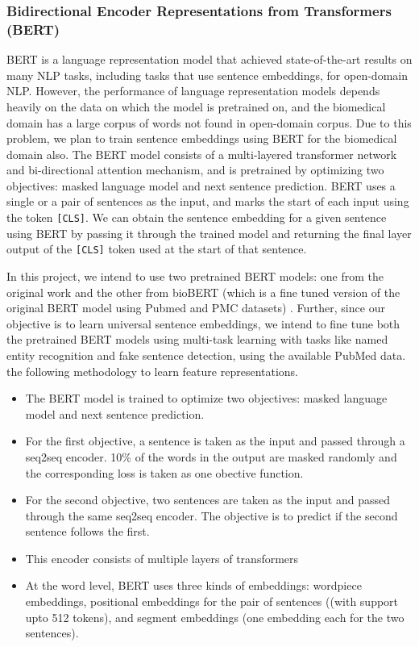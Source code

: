 \documentclass[11pt,a4paper]{article}
\begin{document}
\subsubsection{Bidirectional Encoder Representations from Transformers (BERT) \cite{devlin2018bert}}
BERT is a language representation model that achieved state-of-the-art results on many NLP tasks, including tasks that use sentence embeddings, for open-domain NLP. However, the performance of language representation models depends heavily on the data on which the model is pretrained on, and the biomedical domain has a large corpus of words not found in open-domain corpus. Due to this problem, we plan to train sentence embeddings using BERT for the biomedical domain also. The BERT model consists of a multi-layered transformer network and bi-directional attention mechanism, and is pretrained by optimizing two objectives: masked language model and next sentence prediction. BERT uses a single or a pair of sentences as the input, and marks the start of each input using the token \texttt{[CLS]}. We can obtain the sentence embedding for a given sentence using BERT by passing it through the trained model and returning the final layer output of the \texttt{[CLS]} token used at the start of that sentence.
    
In this project, we intend to use two pretrained BERT models: one from the original work \cite{devlin2018bert} and the other from bioBERT (which is a fine tuned version of the original BERT model using Pubmed and PMC datasets) \cite{lee2019biobert}. Further, since our objective is to learn universal sentence embeddings, we intend to fine tune both the pretrained BERT models using multi-task learning with tasks like named entity recognition and fake sentence detection, using the available PubMed data.
\iffalse
the following methodology to learn feature representations. 
\begin{itemize}
    \item The BERT model is trained to optimize two objectives: masked language model and next sentence prediction.
    \item For the first objective, a sentence is taken as the input and passed through a seq2seq encoder. 10\% of the words in the output are masked randomly and the corresponding loss is taken as one obective function. 
    \item For the second objective, two sentences are taken as the input and passed through the same seq2seq encoder. The objective is to predict if the second sentence follows the first. 
    \item This encoder consists of multiple layers of transformers 
    \item  At the word level, BERT uses three kinds of embeddings: wordpiece embeddings, positional embeddings for the pair of sentences ((with support upto 512 tokens), and segment embeddings (one embedding each for the two sentences).
\end{itemize}
    
\end{document}
